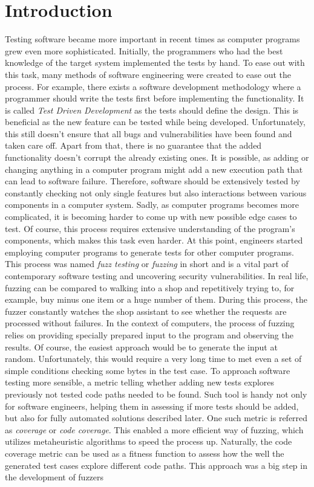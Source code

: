 \clearpage %
\section{Introduction} \label{chap:intr}

Testing software became more important in recent times as computer programs grew even more sophisticated. Initially, the programmers who had the best knowledge of the target system implemented the tests by hand. To ease out with this task, many methods of software engineering were created to ease out the process. For example, there exists a software development methodology where a programmer should write the tests first before implementing the functionality. It is called \textit{Test Driven Development} as the tests should define the design. This is beneficial as the new feature can be tested while being developed. Unfortunately, this still doesn't ensure that all bugs and vulnerabilities have been found and taken care off. Apart from that, there is no guarantee that the added functionality doesn't corrupt the already existing ones. It is possible, as adding or changing anything in a computer program might add a new execution path that can lead to software failure. Therefore, software should be extensively tested by constantly checking not only single features but also interactions between various components in a computer system. Sadly, as computer programs becomes more complicated, it is becoming harder to come up with new possible edge cases to test. Of course, this process requires extensive understanding of the program's components, which makes this task even harder. At this point, engineers started employing computer programs to generate tests for other computer programs. This process was named \textit{fuzz testing} or \textit{fuzzing} in short and is a vital part of contemporary software testing and uncovering security vulnerabilities. In real life, fuzzing can be compared to walking into a shop and repetitively trying to, for example, buy minus one item or a huge number of them. During this process, the fuzzer constantly watches the shop assistant to see whether the requests are processed without failures. In the context of computers, the process of fuzzing relies on providing specially prepared input to the program and observing the results. Of course, the easiest approach would be to generate the input at random. Unfortunately, this would require a very long time to met even a set of simple conditions checking some bytes in the test case. To approach software testing more sensible, a metric telling whether adding new tests explores previously not tested code paths needed to be found. Such tool is handy not only for software engineers, helping them in assessing if more tests should be added, but also for fully automated solutions described later. One such metric is referred as \textit{coverage} or \textit{code coverage}. This enabled a more efficient way of fuzzing, which utilizes metaheuristic algorithms to speed the process up. Naturally, the code coverage metric can be used as a fitness function to assess how the well the generated test cases explore different code paths. This approach was a big step in the development of fuzzers 